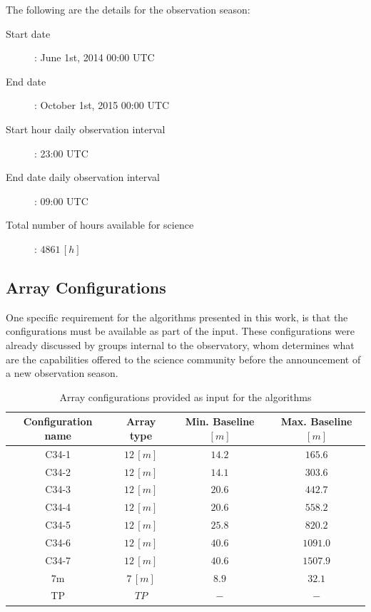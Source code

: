 The following are the details for the observation season:

\begin{description}
\item[Start date]: June 1st, 2014 00:00 UTC 
\item[End date]: October 1st, 2015 00:00 UTC
\item[Start hour daily observation interval]: 23:00 UTC
\item[End date daily observation interval]: 09:00 UTC
\item[Total number of hours available for science]: $4861\,[h]$
\end{description}

\subsection{Array Configurations}

One specific requirement for the algorithms presented in this work, is that the configurations must be available as part of the input. These configurations were already discussed by groups internal to the observatory, whom determines what are the capabilities offered to the science community before the announcement of a new observation season.

\begin{table}[h!]
\begin{center}
\begin{tabular}{|c|c|c|c|}
\hline
Configuration name & Array type & Min. Baseline $[m]$ & Max. Baseline $[m]$\\
\hline
C34-1 & $12\,[m]$ & $14.2$ & $165.6$ \\
\hline
C34-2 & $12\,[m]$ & $14.1$ & $303.6$ \\
\hline
C34-3 & $12\,[m]$ & $20.6$ & $442.7$ \\
\hline
C34-4 & $12\,[m]$ & $20.6$ & $558.2$ \\
\hline
C34-5 & $12\,[m]$ & $25.8$ & $820.2$ \\
\hline
C34-6 & $12\,[m]$ & $40.6$ & $1091.0$ \\
\hline
C34-7 & $12\,[m]$ & $40.6$ & $1507.9$ \\
\hline
7m    & $7\,[m]$  & $8.9$  & $32.1$ \\
\hline
TP    & $TP$      & $-$    & $-$ \\
\hline
\end{tabular}
\end{center}
\caption{Array configurations provided as input for the algorithms}
\label{table:input-array-configs}
\end{table}


